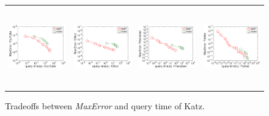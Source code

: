 \begin{figure}[t]
	\begin{small}
		\centering
		\vspace{-1mm}
		\begin{tabular}{cccc}
			\hspace{-4.4mm} \includegraphics[height=34.5mm]{./Figs/Katz-maxerr-query-YT.eps} &
			\hspace{-4.4mm} \includegraphics[height=34.5mm]{./Figs/Katz-maxerr-query-OL.eps} &
			\hspace{-4.4mm} \includegraphics[height=34.5mm]{./Figs/Katz-maxerr-query-FR.eps} &
			\hspace{-4.4mm} \includegraphics[height=34.5mm]{./Figs/Katz-maxerr-query-TW.eps} 
		\end{tabular}
		\vspace{-5mm}
		\caption{Tradeoffs between {\em MaxError} and query time of Katz.}
		\label{fig:Katz-MaxError-query}
		\vspace{-2mm}
	\end{small}
\end{figure}


